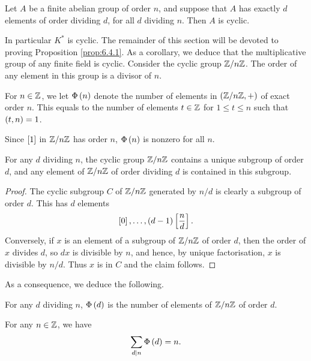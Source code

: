 \begin{proposition}
\label{prop:6.4.1}
Let $ A $ be a finite abelian group of order $ n $, and suppose that $ A $ has exactly $ d $ elements of order dividing $ d $, for all $ d $ dividing $ n $. Then $ A $ is cyclic.
\end{proposition}

In particular $ K^* $ is cyclic. The remainder of this section will be devoted to proving Proposition \ref{prop:6.4.1}. As a corollary, we deduce that the multiplicative group of any finite field is cyclic. Consider the cyclic group $ \Z / n\Z $. The order of any element in this group is a divisor of $ n $.

\begin{definition}
For $ n \in \Z $, we let $ \Phi\rb{n} $ denote the number of elements in $ \rb{\Z / n\Z, +} $ of exact order $ n $. This equals to the number of elements $ t \in \Z $ for $ 1 \le t \le n $ such that $ \rb{t, n} = 1 $.
\end{definition}

\begin{note*}
Since $ \sb{1} $ in $ \Z / n\Z $ has order $ n $, $ \Phi\rb{n} $ is nonzero for all $ n $.
\end{note*}

\begin{lemma}
For any $ d $ dividing $ n $, the cyclic group $ \Z / n\Z $ contains a unique subgroup of order $ d $, and any element of $ \Z / n\Z $ of order dividing $ d $ is contained in this subgroup.
\end{lemma}

\begin{proof}
The cyclic subgroup $ C $ of $ \Z / n\Z $ generated by $ n / d $ is clearly a subgroup of order $ d $. This has $ d $ elements
$$ \sb{0}, \dots, \rb{d - 1}\sb{\dfrac{n}{d}}. $$
Conversely, if $ x $ is an element of a subgroup of $ \Z / n\Z $ of order $ d $, then the order of $ x $ divides $ d $, so $ dx $ is divisible by $ n $, and hence, by unique factorisation, $ x $ is divisible by $ n / d $. Thus $ x $ is in $ C $ and the claim follows.
\end{proof}

As a consequence, we deduce the following.

\begin{corollary}
For any $ d $ dividing $ n $, $ \Phi\rb{d} $ is the number of elements of $ \Z / n\Z $ of order $ d $.
\end{corollary}

\begin{corollary}
\label{cor:6.4.5}
For any $ n \in \Z $, we have
$$ \sum_{d \mid n} \Phi\rb{d} = n. $$
\end{corollary}

